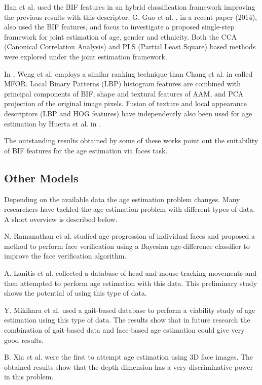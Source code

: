 Han et al. \cite{han:age} used the BIF features in an hybrid classification framework improving the previous results with this descriptor. G. Guo et al. \cite{Guo2014761}, in a recent paper (2014), also used the BIF features, and focus to investigate a proposed single-step framework for joint estimation of age, gender and ethnicity. Both the CCA (Canonical Correlation Analysis) \cite{hotelling1936relations} and PLS (Partial Least Square) based methods were explored under the joint estimation framework.

In \cite{6553772}, Weng et al. employs a similar ranking technique than Chang et al. in \cite{5995437} called MFOR. Local Binary Patterns (LBP) histogram features are combined with principal components of BIF, shape and textural features of AAM, and PCA projection of the original image pixels. Fusion of texture and local appearance descriptors (LBP and HOG features) have independently also been used for age estimation by Huerta et al. in \cite{HuFerPra14}.

The outstanding results obtained by some of these works point out the suitability of BIF features for the age estimation via faces task.

\subsection{Other Models}\label{subsec:oth}

Depending on the available data the age estimation problem changes. Many researchers have tackled the age estimation problem with different types of data. A short overview is described below.

N. Ramanathan et al. \cite{1709980} studied age progression of individual faces and proposed a method to perform face verification using a Bayesian age-difference classifier to improve the face verification algorithm.

A. Lanitis et al. \cite{5463396} collected a database of head and mouse tracking movements and then attempted to perform age estimation with this data. This preliminary study shows the potential of using this type of data.

Y. Mikihara et al. \cite{6117531} used a gait-based database to perform a viability study of age estimation using this type of data. The results show that in future research the combination of gait-based data and face-based age estimation could give very good results.

B. Xia et al. \cite{xia:hal-00904007} were the first to attempt age estimation using 3D face images. The obtained results show that the depth dimension has a very discriminative power in this problem. 

